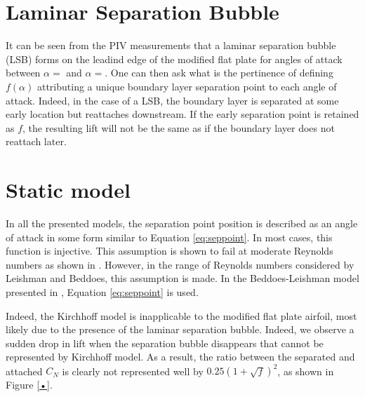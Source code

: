 

\section{Laminar Separation Bubble}
\label{LSB}

It can be seen from the PIV measurements that a laminar separation bubble (LSB) forms on the leadind edge of the modified flat plate for angles of attack between $\alpha=$ and $\alpha=$. One can then ask what is the pertinence of defining $f(\alpha)$ attributing a unique boundary layer separation point to each angle of attack. Indeed, in the case of a LSB, the boundary layer is separated at some early location but reattaches downstream. If the early separation point is retained as $f$, the resulting lift will not be the same as if the boundary layer does not reattach later. 

\section{Static model}

In all the presented models, the separation point position is described as an angle of attack in some form similar to Equation \eqref{eq:seppoint}. In most cases, this function is injective. This assumption is shown to fail at moderate Reynolds numbers as shown in \autocite{tank_possibility_2017}. However, in the range of Reynolds numbers considered by Leishman and Beddoes, this assumption is made. In the Beddoes-Leishman model presented in \autocite{leishman_semi-empirical_1989}, Equation \eqref{eq:seppoint} is used.

Indeed, the Kirchhoff model is inapplicable to the modified flat plate airfoil, most likely due to the presence of the laminar separation bubble. Indeed, we observe a sudden drop in lift when the separation bubble disappears that cannot be represented by Kirchhoff model. As a result, the ratio between the separated and attached $C_N$ is clearly not represented well by $0.25(1+\sqrt{f})^2$, as shown in Figure \ref{•}.